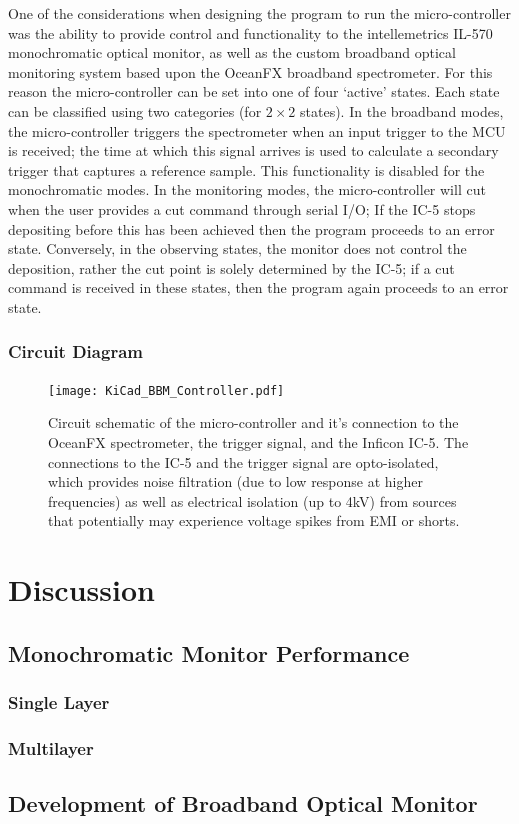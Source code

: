 \documentclass[10pt,a4paper,portrait]{report}
\begin{document}
One of the considerations when designing the program to run the micro-controller was the ability to provide control and functionality to the intellemetrics IL-570 monochromatic optical monitor, as well as the custom broadband optical monitoring system based upon the OceanFX broadband spectrometer. For this reason the micro-controller can be set into one of four `active' states. Each state can be classified using two categories (for $2\times 2$ states). In the broadband modes, the micro-controller triggers the spectrometer when an input trigger to the MCU is received;
the time at which this signal arrives is used to calculate a secondary trigger that captures a reference sample.
This functionality is disabled for the monochromatic modes.
In the monitoring modes, the micro-controller will cut when the user provides a cut command through serial I/O;
If the IC-5 stops depositing before this has been achieved then the program proceeds to an error state.
Conversely, in the observing states, the monitor does not control the deposition,  rather the cut point is solely determined by the IC-5;
if a cut command is received in these states, then the program again proceeds to an error state.

\subsection{Circuit Diagram}

\begin{figure}[H]
\begin{center}
\centering
\texttt{[image: KiCad\_BBM\_Controller.pdf]}
\end{center}
\vspace*{-5mm}
\caption{Circuit schematic of the micro-controller and it's connection to the OceanFX spectrometer, the trigger signal, and the Inficon IC-5. The connections to the IC-5 and the trigger signal are opto-isolated, which provides noise filtration (due to low response at higher frequencies) as well as electrical isolation  (up to 4kV) from sources that potentially may experience voltage spikes from EMI or shorts.}
\end{figure}

\chapter{Discussion}
\section{Monochromatic Monitor Performance}
\subsection{Single Layer}
\subsection{Multilayer}
\section{Development of Broadband Optical Monitor}
\end{document}
